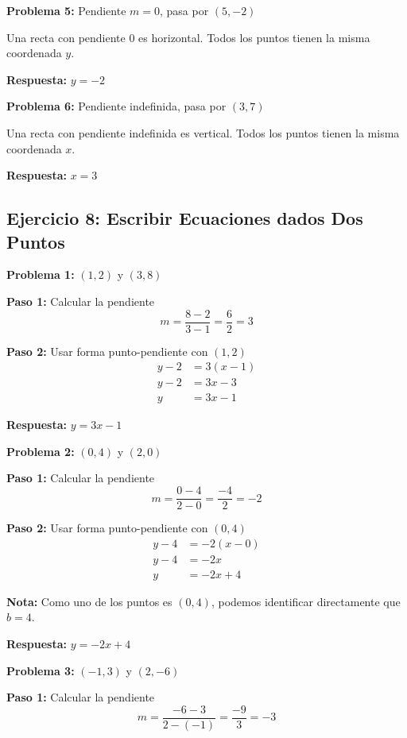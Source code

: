 \textbf{Problema 5:} Pendiente $m = 0$, pasa por $(5, -2)$

Una recta con pendiente 0 es horizontal. Todos los puntos tienen la misma coordenada $y$.

\textbf{Respuesta:} $y = -2$

\medskip

\textbf{Problema 6:} Pendiente indefinida, pasa por $(3, 7)$

Una recta con pendiente indefinida es vertical. Todos los puntos tienen la misma coordenada $x$.

\textbf{Respuesta:} $x = 3$

\newpage

\subsection*{Ejercicio 8: Escribir Ecuaciones dados Dos Puntos}

\textbf{Problema 1:} $(1, 2)$ y $(3, 8)$

\textbf{Paso 1:} Calcular la pendiente
$$m = \frac{8 - 2}{3 - 1} = \frac{6}{2} = 3$$

\textbf{Paso 2:} Usar forma punto-pendiente con $(1, 2)$
\begin{align*}
y - 2 &= 3(x - 1) \\
y - 2 &= 3x - 3 \\
y &= 3x - 1
\end{align*}

\textbf{Respuesta:} $y = 3x - 1$

\medskip

\textbf{Problema 2:} $(0, 4)$ y $(2, 0)$

\textbf{Paso 1:} Calcular la pendiente
$$m = \frac{0 - 4}{2 - 0} = \frac{-4}{2} = -2$$

\textbf{Paso 2:} Usar forma punto-pendiente con $(0, 4)$
\begin{align*}
y - 4 &= -2(x - 0) \\
y - 4 &= -2x \\
y &= -2x + 4
\end{align*}

\textbf{Nota:} Como uno de los puntos es $(0, 4)$, podemos identificar directamente que $b = 4$.

\textbf{Respuesta:} $y = -2x + 4$

\medskip

\textbf{Problema 3:} $(-1, 3)$ y $(2, -6)$

\textbf{Paso 1:} Calcular la pendiente
$$m = \frac{-6 - 3}{2 - (-1)} = \frac{-9}{3} = -3$$

